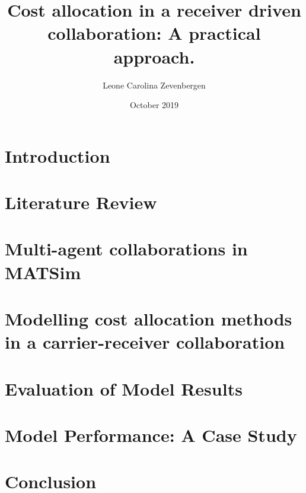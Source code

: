 \documentclass[12pt]{report}
\title{Cost allocation in a receiver driven collaboration: A practical approach.}
\author{Leone Carolina Zevenbergen}
\date{October 2019}
\begin{document}




\tableofcontents
\listoftables
\listoffigures
\glsaddall
\printglossary[type=\acronymtype,title=Acronyms]


\chapter{Introduction}


\chapter{Literature Review}


\chapter{Multi-agent collaborations in MATSim}


\chapter{Modelling cost allocation methods in a carrier-receiver collaboration}


\chapter{Evaluation of Model Results}


\chapter{Model Performance: A Case Study}


\chapter{Conclusion}





\end{document}
